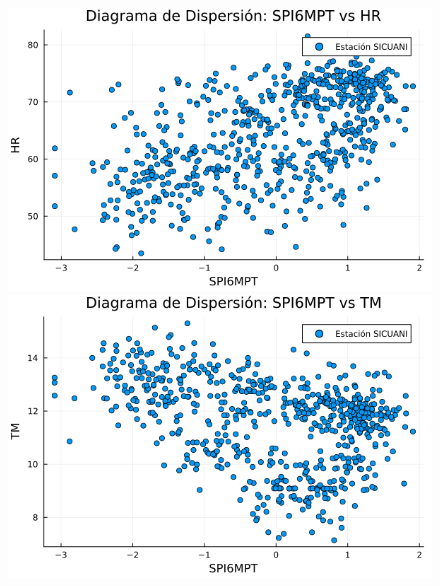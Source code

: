 \begin{figure}[htbp]
\begin{minipage}{0.32\textwidth}
\end{minipage}

\vspace{0.5cm}  %

\begin{minipage}{0.32\textwidth}
    \centering
    \includegraphics[width=\linewidth]{Capitulos/Scaterplot/SICUANI_SPI6MPT_vs_HR.png}
\end{minipage}\hfill
\begin{minipage}{0.32\textwidth}
    \centering
    \includegraphics[width=\linewidth]{Capitulos/Scaterplot/SICUANI_SPI6MPT_vs_TM.png}
\end{minipage}\hfill
\begin{minipage}{0.32\textwidth}
    \centering

\end{minipage}
\end{figure}
